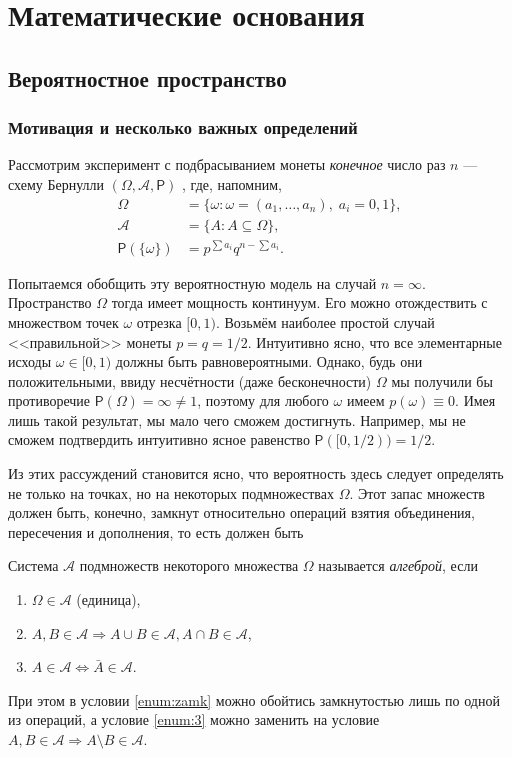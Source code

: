 \chapter{Математические основания}
\section{Вероятностное пространство}
\subsection{Мотивация и несколько важных определений}
Рассмотрим эксперимент с подбрасыванием монеты \textsl{конечное} число раз $ n $ --- схему Бернулли $ (\Omega, \mathscr A, \mathsf P) $ , где, напомним,
\begin{align*}
	\Omega &= \{\omega\colon \omega = (a_1, \ldots, a_n),\; a_i = 0, 1\},\\
	\mathscr A &= \{A \colon A \subseteq \Omega\},\\
	\mathsf P(\{\omega\}) &= p^{\sum a_i}q^{n-\sum a_i}.
\end{align*}

Попытаемся обобщить эту вероятностную модель на случай $ n = \infty $.
Пространство $ \Omega $ тогда имеет мощность континуум. Его можно отождествить с
множеством точек $ \omega $ отрезка $ [0, 1) $. Возьмём наиболее простой
случай <<правильной>> монеты $ p = q = 1/2 $. Интуитивно ясно, что все
элементарные исходы $
\omega \in [0, 1) $ должны быть равновероятными. Однако, будь они
положительными, ввиду несчётности (даже бесконечности) $ \Omega $ мы получили бы противоречие $
\mathsf P(\Omega) = \infty \neq 1 $, поэтому для любого $ \omega $ имеем $
p(\omega) \equiv 0 $. Имея лишь такой результат, мы мало чего сможем достигнуть.
Например, мы не сможем подтвердить интуитивно ясное равенство $ \mathsf P([0, 1/2))
= 1/2$.

Из этих рассуждений становится ясно, что вероятность здесь следует определять не
только на точках, но на некоторых подмножествах $ \Omega $. Этот запас множеств
должен быть, конечно, замкнут относительно операций взятия объединения,
пересечения и дополнения, то есть должен быть

\begin{definition}
	\label{def:alg}
Система $ \mathscr A $ подмножеств некоторого множества $ \Omega $ называется
\emph{алгеброй}, если
\begin{enumerate}
\item $\Omega \in \mathscr A$ (единица),
	\item\label{enum:zamk} $ A, B \in \mathscr A \Rightarrow A \cup B \in \mathscr A, A \cap B \in
		\mathscr A$,
	\item\label{enum:3} $ A \in \mathscr A \Leftrightarrow \bar A \in \mathscr A $.
\end{enumerate}
\begin{remark*}При этом в условии \ref{enum:zamk} можно обойтись замкнутостью лишь по одной из
операций, а условие \ref{enum:3} можно заменить на условие
$ A, B \in \mathscr A \Rightarrow A \setminus B
\in \mathscr A $.
\end{remark*}

\end{definition}

